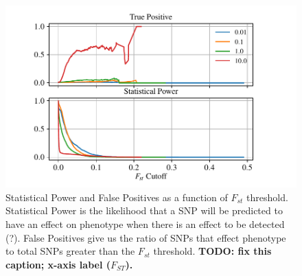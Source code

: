 \documentclass{article}
\begin{document}
\begin{figure}
    \begin{center}
        \includegraphics{Final_Plots/True_Power_0_5_500.pdf}
          \caption{ 
        Statistical Power and False Positives as a function of $F_{st}$ threshold. 
        Statistical Power is the likelihood that a SNP will be predicted to have an effect on phenotype when there is an effect to be detected (?).
        False Positives give us the ratio of SNPs that effect phenotype to total SNPs greater than the $F_{st}$ threshold.
            \textbf{
                TODO: fix this caption; x-axis label ($F_{ST}$).}
        }
          \label{fig:Power_FP_5lakes}
    \end{center}
\end{figure}

\end{document}
